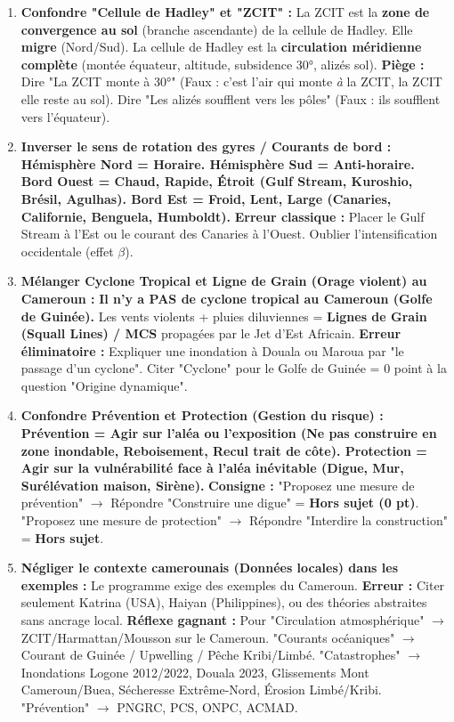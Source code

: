\documentclass[11pt]{article}
\begin{document}
\begin{attention}
    \begin{enumerate}
        \item \textbf{Confondre "Cellule de Hadley" et "ZCIT" :} La ZCIT est la \textbf{zone de convergence au sol} (branche ascendante) de la cellule de Hadley. Elle \textbf{migre} (Nord/Sud). La cellule de Hadley est la \textbf{circulation méridienne complète} (montée équateur, altitude, subsidence 30°, alizés sol). \textbf{Piège :} Dire "La ZCIT monte à 30°" (Faux : c'est l'air qui monte \emph{à} la ZCIT, la ZCIT elle reste au sol). Dire "Les alizés soufflent vers les pôles" (Faux : ils soufflent vers l'équateur).
        \item \textbf{Inverser le sens de rotation des gyres / Courants de bord :} \textbf{Hémisphère Nord = Horaire. Hémisphère Sud = Anti-horaire.} \textbf{Bord Ouest = Chaud, Rapide, Étroit (Gulf Stream, Kuroshio, Brésil, Agulhas). Bord Est = Froid, Lent, Large (Canaries, Californie, Benguela, Humboldt).} \textbf{Erreur classique :} Placer le Gulf Stream à l'Est ou le courant des Canaries à l'Ouest. Oublier l'intensification occidentale (effet $\beta$).
        \item \textbf{Mélanger Cyclone Tropical et Ligne de Grain (Orage violent) au Cameroun :} \textbf{Il n'y a PAS de cyclone tropical au Cameroun (Golfe de Guinée).} Les vents violents + pluies diluviennes = \textbf{Lignes de Grain (Squall Lines) / MCS} propagées par le Jet d'Est Africain. \textbf{Erreur éliminatoire :} Expliquer une inondation à Douala ou Maroua par "le passage d'un cyclone". Citer "Cyclone" pour le Golfe de Guinée = 0 point à la question "Origine dynamique".
        \item \textbf{Confondre Prévention et Protection (Gestion du risque) :} \textbf{Prévention = Agir sur l'aléa ou l'exposition (Ne pas construire en zone inondable, Reboisement, Recul trait de côte). Protection = Agir sur la vulnérabilité face à l'aléa inévitable (Digue, Mur, Surélévation maison, Sirène).} \textbf{Consigne :} "Proposez une mesure de prévention" $\rightarrow$ Répondre "Construire une digue" = \textbf{Hors sujet (0 pt)}. "Proposez une mesure de protection" $\rightarrow$ Répondre "Interdire la construction" = \textbf{Hors sujet}.
        \item \textbf{Négliger le contexte camerounais (Données locales) dans les exemples :} Le programme exige des exemples du Cameroun. \textbf{Erreur :} Citer seulement Katrina (USA), Haiyan (Philippines), ou des théories abstraites sans ancrage local. \textbf{Réflexe gagnant :} Pour "Circulation atmosphérique" $\rightarrow$ ZCIT/Harmattan/Mousson sur le Cameroun. "Courants océaniques" $\rightarrow$ Courant de Guinée / Upwelling / Pêche Kribi/Limbé. "Catastrophes" $\rightarrow$ Inondations Logone 2012/2022, Douala 2023, Glissements Mont Cameroun/Buea, Sécheresse Extrême-Nord, Érosion Limbé/Kribi. "Prévention" $\rightarrow$ PNGRC, PCS, ONPC, ACMAD.
    \end{enumerate}
\end{attention}
\end{document}
